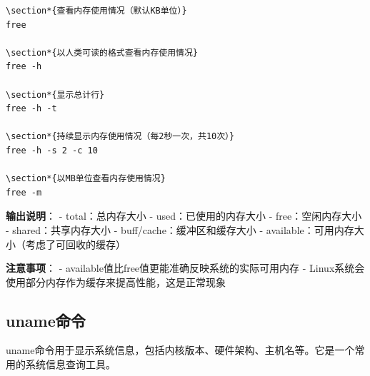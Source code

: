 \documentclass[12pt,UTF8]{ctexbook}
\begin{document}
\begin{verbatim}
\section*{查看内存使用情况（默认KB单位）}
free

\section*{以人类可读的格式查看内存使用情况}
free -h

\section*{显示总计行}
free -h -t

\section*{持续显示内存使用情况（每2秒一次，共10次）}
free -h -s 2 -c 10

\section*{以MB单位查看内存使用情况}
free -m
\end{verbatim}

\textbf{输出说明}：
- total：总内存大小
- used：已使用的内存大小
- free：空闲内存大小
- shared：共享内存大小
- buff/cache：缓冲区和缓存大小
- available：可用内存大小（考虑了可回收的缓存）

\textbf{注意事项}：
- available值比free值更能准确反映系统的实际可用内存
- Linux系统会使用部分内存作为缓存来提高性能，这是正常现象

\subsection{uname命令}
uname命令用于显示系统信息，包括内核版本、硬件架构、主机名等。它是一个常用的系统信息查询工具。
\end{document}
